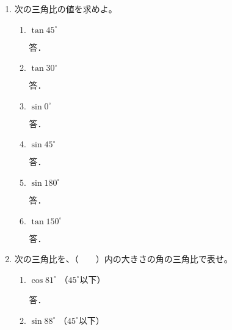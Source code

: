 \documentclass[b4paper,twocolumn]{jsarticle}
\begin{document}
\newpage


\begin{enumerate}
\item 次の三角比の値を求めよ。

\begin{enumerate}
\item $\tan 45^\circ $
\vfill

\hfill 答．\underline{\hspace{50truemm}}

\item $\tan 30^\circ $
\vfill

\hfill 答．\underline{\hspace{50truemm}}

\item $\sin 0^\circ $
\vfill

\hfill 答．\underline{\hspace{50truemm}}

\item $\sin 45^\circ $
\vfill

\hfill 答．\underline{\hspace{50truemm}}

\item $\sin 180^\circ $
\vfill

\hfill 答．\underline{\hspace{50truemm}}

\item $\tan 150^\circ $
\vfill

\hfill 答．\underline{\hspace{50truemm}}

\end{enumerate}

\item 次の三角比を、（　　）内の大きさの角の三角比で表せ。

\begin{enumerate}
\item $\cos 81^\circ$ \hfill （$45^\circ$以下） \hspace{30truemm}
\vfill

\hfill 答．\underline{\hspace{50truemm}}

\item $\sin 88^\circ$ \hfill （$45^\circ$以下） \hspace{30truemm}
\vfill


\end{enumerate}
\end{enumerate}
\end{document}
